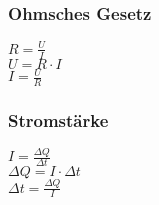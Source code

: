\subsubsection{Ohmsches Gesetz} 
\begin{minipage}{0.45\textwidth} 
$ R = \frac{U}{I} $\\ 
$ U = R\cdot I $\\ 
$ I = \frac{U}{R} $\\ 
\end{minipage} 
\begin{minipage}{0.45\textwidth} 
 
\end{minipage} 
\subsubsection{Stromstärke} 
\begin{minipage}{0.45\textwidth} 
$ I = \frac{\Delta Q}{\Delta t} $\\ 
$ \Delta Q =I\cdot \Delta t $\\ 
$ \Delta t = \frac{\Delta Q}{I} $\\ 
\end{minipage} 
\begin{minipage}{0.45\textwidth} 
 
\end{minipage} 
